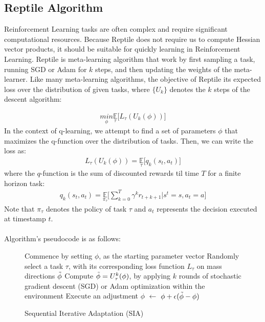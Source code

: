 \documentclass[runningheads]{llncs}
\begin{document}
\subsection{Reptile Algorithm} 
Reinforcement Learning tasks are often complex and require significant computational resources. Because Reptile does not require us to compute Hessian vector products, it should be suitable for quickly learning in Reinforcement Learning. Reptile is meta-learning algorithm that work by first sampling a task, running SGD or Adam for $k$ steps, and then updating the weights of the meta-learner. Like many meta-learning algorithms, the objective of Reptile its expected loss over the distribution of given tasks, where $\{ U_k \}$ denotes the $k$ steps of the descent algorithm:    

\begin{align}
    \underset{\phi}{min}\underset{\tau}{\mathbb{E}}
    \Big[L_{\tau}(U_{k}(\phi))\Big]
\end{align} 
In the context of q-learning, we attempt to find a set of parameters $\phi$ that maximizes the q-function over the distribution of tasks. Then, we can write the loss as: 
\begin{align}
    L_{\tau}(U_{k}(\phi)) = \underset{\tau}{\mathbb{E}}
    \Big[q_{k}(s_t, a_t)\Big]
\end{align} 
where the $q$-function is the sum of discounted rewards til time $T$ for a finite horizon task: 
\begin{align}
    q_{k}(s_t, a_t) = \underset{\pi_{\tau}}{\mathbb{E}}\Big[\sum_{k=0}^T \gamma^k r_{t+k+1} | s^t = s, a_t = a\Big] 
\end{align} 
Note that $\pi_{\tau}$ denotes the policy of task $\tau$ and $a_t$ represents the decision executed at timestamp $t$. \\\\ 
Algorithm's pseudocode is as follows: \\  

\begin{figure}[H]
  \centering
  \begin{minipage}{.7\linewidth}
    \begin{algorithm}[H]
        \caption{Sequential Iterative Adaptation (SIA)} 
        \begin{algorithmic}[1] 
            \State Commence by setting $\phi$, as the starting parameter vector
            \State Randomly select a task $\tau$, with its corresponding loss function $L_{\tau}$ on mass directions $\Tilde{\phi}$
            \State Compute $\Tilde{\phi} = U^k_{\tau}(\phi)$, by applying $k$ rounds of stochastic gradient descent (SGD) or Adam optimization within the environment 
            \State Execute an adjustment $\phi$ $\longleftarrow$ $\phi + \epsilon(\Tilde{\phi} - \phi)$
            \EndFor 
        \end{algorithmic}
     \end{algorithm}
  \end{minipage}
\end{figure}
 
\end{document}
